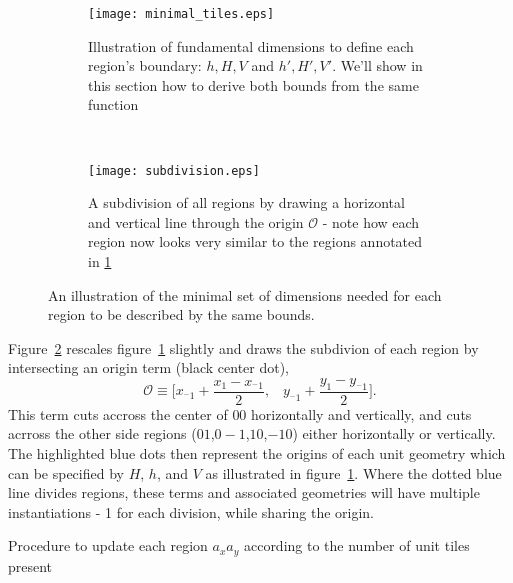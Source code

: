 \begin{figure}[ht]
  \centering
  \begin{subfigure}[ht]{.5\textwidth}
    \centering
    \texttt{[image: minimal\_tiles.eps]}
    \caption{Illustration of fundamental dimensions to define each region's boundary: $h,H,V$ and
    $h',H',V'$.  We'll show in this section how to derive both bounds from the same function}\label{fig:mintile}
  \end{subfigure}
  ~
  \begin{subfigure}[ht]{.4\textwidth}
    \centering
    \texttt{[image: subdivision.eps]}
    \caption{A subdivision of all regions by drawing a horizontal and vertical line through the origin
    $\mathcal{O}$ - note how each region now looks very similar to the regions annotated in \ref{fig:mintile}}
    \label{fig:subdivision}
    \end{subfigure}
  \caption{An illustration of the minimal set of dimensions needed for each region to be described by the same
  bounds.}
  \label{fig:tiles}
\end{figure}


Figure~\ref{fig:subdivision} rescales figure~\ref{fig:mintile} slightly and draws the subdivion of each region
by intersecting an origin term (black center dot),
\begin{equation}
  \mathcal{O} \equiv \bigl[x_{^-1} + \frac{x_1 - x_{^-1}}{2}, \;\;\; y_{^-1} + \frac{y_1 - y_{^-1}}{2} \bigl].
  \label{eq:O}
\end{equation}
This term cuts accross the center of $00$ horizontally and vertically, and cuts acrross the other side regions
($01$,$0-1$,$10$,$-10$) either horizontally or vertically.  The highlighted blue dots then represent the
origins of each unit geometry which can be specified by $H$, $h$, and $V$ as illustrated
in figure~\ref{fig:mintile}.  Where the dotted blue line divides regions, these terms and associated
geometries will have multiple instantiations - 1 for each division, while sharing the origin.

\begin{algorithm}[h]
  \setcounter{AlgoLine}{0}
  \caption{Procedure to update each region $a_xa_y$ according to the number of unit tiles present}
  \label{alg:tile_update}
\end{algorithm}

